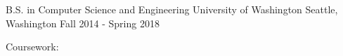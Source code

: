 \begin{cventries}
    \cventry
        {B.S. in Computer Science and Engineering} %
        {University of Washington} %
        {Seattle, Washington} %
        {Fall 2014 - Spring 2018} %
        {
            \begin{cvitems} %
                \item 
                    {Coursework:
                        \footnotesize{
                            \newline
                        }
                    }
            \end{cvitems}
        }
\end{cventries}